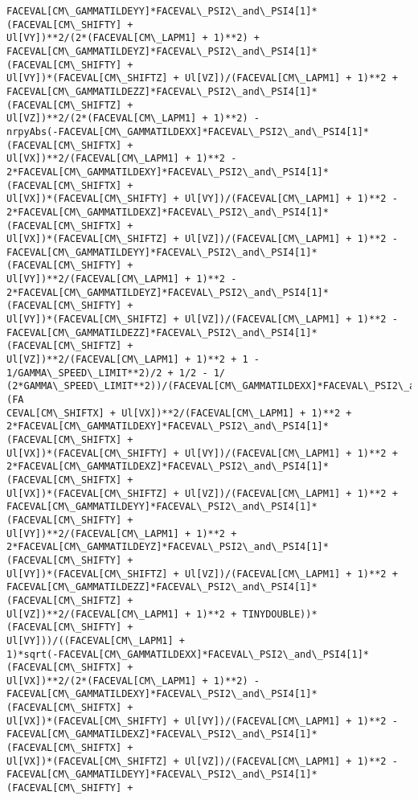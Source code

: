 \documentclass[landscape,letterpaper,10pt,english]{article}
\begin{document}
\begin{Verbatim}[commandchars=\\\{\}]
FACEVAL[CM\_GAMMATILDEYY]*FACEVAL\_PSI2\_and\_PSI4[1]*(FACEVAL[CM\_SHIFTY] +
Ul[VY])**2/(2*(FACEVAL[CM\_LAPM1] + 1)**2) +
FACEVAL[CM\_GAMMATILDEYZ]*FACEVAL\_PSI2\_and\_PSI4[1]*(FACEVAL[CM\_SHIFTY] +
Ul[VY])*(FACEVAL[CM\_SHIFTZ] + Ul[VZ])/(FACEVAL[CM\_LAPM1] + 1)**2 +
FACEVAL[CM\_GAMMATILDEZZ]*FACEVAL\_PSI2\_and\_PSI4[1]*(FACEVAL[CM\_SHIFTZ] +
Ul[VZ])**2/(2*(FACEVAL[CM\_LAPM1] + 1)**2) -
nrpyAbs(-FACEVAL[CM\_GAMMATILDEXX]*FACEVAL\_PSI2\_and\_PSI4[1]*(FACEVAL[CM\_SHIFTX] +
Ul[VX])**2/(FACEVAL[CM\_LAPM1] + 1)**2 -
2*FACEVAL[CM\_GAMMATILDEXY]*FACEVAL\_PSI2\_and\_PSI4[1]*(FACEVAL[CM\_SHIFTX] +
Ul[VX])*(FACEVAL[CM\_SHIFTY] + Ul[VY])/(FACEVAL[CM\_LAPM1] + 1)**2 -
2*FACEVAL[CM\_GAMMATILDEXZ]*FACEVAL\_PSI2\_and\_PSI4[1]*(FACEVAL[CM\_SHIFTX] +
Ul[VX])*(FACEVAL[CM\_SHIFTZ] + Ul[VZ])/(FACEVAL[CM\_LAPM1] + 1)**2 -
FACEVAL[CM\_GAMMATILDEYY]*FACEVAL\_PSI2\_and\_PSI4[1]*(FACEVAL[CM\_SHIFTY] +
Ul[VY])**2/(FACEVAL[CM\_LAPM1] + 1)**2 -
2*FACEVAL[CM\_GAMMATILDEYZ]*FACEVAL\_PSI2\_and\_PSI4[1]*(FACEVAL[CM\_SHIFTY] +
Ul[VY])*(FACEVAL[CM\_SHIFTZ] + Ul[VZ])/(FACEVAL[CM\_LAPM1] + 1)**2 -
FACEVAL[CM\_GAMMATILDEZZ]*FACEVAL\_PSI2\_and\_PSI4[1]*(FACEVAL[CM\_SHIFTZ] +
Ul[VZ])**2/(FACEVAL[CM\_LAPM1] + 1)**2 + 1 - 1/GAMMA\_SPEED\_LIMIT**2)/2 + 1/2 - 1/
(2*GAMMA\_SPEED\_LIMIT**2))/(FACEVAL[CM\_GAMMATILDEXX]*FACEVAL\_PSI2\_and\_PSI4[1]*(FA
CEVAL[CM\_SHIFTX] + Ul[VX])**2/(FACEVAL[CM\_LAPM1] + 1)**2 +
2*FACEVAL[CM\_GAMMATILDEXY]*FACEVAL\_PSI2\_and\_PSI4[1]*(FACEVAL[CM\_SHIFTX] +
Ul[VX])*(FACEVAL[CM\_SHIFTY] + Ul[VY])/(FACEVAL[CM\_LAPM1] + 1)**2 +
2*FACEVAL[CM\_GAMMATILDEXZ]*FACEVAL\_PSI2\_and\_PSI4[1]*(FACEVAL[CM\_SHIFTX] +
Ul[VX])*(FACEVAL[CM\_SHIFTZ] + Ul[VZ])/(FACEVAL[CM\_LAPM1] + 1)**2 +
FACEVAL[CM\_GAMMATILDEYY]*FACEVAL\_PSI2\_and\_PSI4[1]*(FACEVAL[CM\_SHIFTY] +
Ul[VY])**2/(FACEVAL[CM\_LAPM1] + 1)**2 +
2*FACEVAL[CM\_GAMMATILDEYZ]*FACEVAL\_PSI2\_and\_PSI4[1]*(FACEVAL[CM\_SHIFTY] +
Ul[VY])*(FACEVAL[CM\_SHIFTZ] + Ul[VZ])/(FACEVAL[CM\_LAPM1] + 1)**2 +
FACEVAL[CM\_GAMMATILDEZZ]*FACEVAL\_PSI2\_and\_PSI4[1]*(FACEVAL[CM\_SHIFTZ] +
Ul[VZ])**2/(FACEVAL[CM\_LAPM1] + 1)**2 + TINYDOUBLE))*(FACEVAL[CM\_SHIFTY] +
Ul[VY]))/((FACEVAL[CM\_LAPM1] +
1)*sqrt(-FACEVAL[CM\_GAMMATILDEXX]*FACEVAL\_PSI2\_and\_PSI4[1]*(FACEVAL[CM\_SHIFTX] +
Ul[VX])**2/(2*(FACEVAL[CM\_LAPM1] + 1)**2) -
FACEVAL[CM\_GAMMATILDEXY]*FACEVAL\_PSI2\_and\_PSI4[1]*(FACEVAL[CM\_SHIFTX] +
Ul[VX])*(FACEVAL[CM\_SHIFTY] + Ul[VY])/(FACEVAL[CM\_LAPM1] + 1)**2 -
FACEVAL[CM\_GAMMATILDEXZ]*FACEVAL\_PSI2\_and\_PSI4[1]*(FACEVAL[CM\_SHIFTX] +
Ul[VX])*(FACEVAL[CM\_SHIFTZ] + Ul[VZ])/(FACEVAL[CM\_LAPM1] + 1)**2 -
FACEVAL[CM\_GAMMATILDEYY]*FACEVAL\_PSI2\_and\_PSI4[1]*(FACEVAL[CM\_SHIFTY] +

\end{Verbatim}
\end{document}
